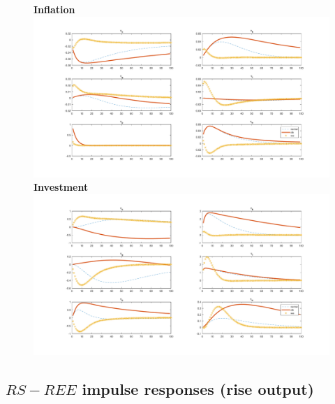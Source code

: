 \documentclass[12pt,reqno]{article}
\numberwithin{equation}{section}
\begin{document}
\begin{figure}[H]
\textbf{Inflation}\\
\includegraphics[scale=0.4]{AR1_impresp_pinf.pdf}\\
\textbf{Investment}\\
\includegraphics[scale=0.4]{AR1_impresp_inve.pdf}\\
\end{figure}

\newpage
\subsection*{$RS-REE$ impulse responses (rise output)}
\end{document}
